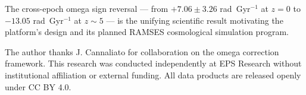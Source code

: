 \documentclass[twocolumn]{aastex631}
\begin{document}
The cross-epoch omega sign reversal --- from $+7.06 \pm 3.26$ rad~Gyr$^{-1}$
at $z = 0$ to $-13.05$ rad~Gyr$^{-1}$ at $z \sim 5$ --- is the unifying
scientific result motivating the platform's design and its planned RAMSES
cosmological simulation program.

\begin{acknowledgments}
The author thanks J. Cannaliato for collaboration on the omega correction
framework. This research was conducted independently at EPS Research
without institutional affiliation or external funding. All data products
are released openly under CC BY 4.0.
\end{acknowledgments}


\end{document}
